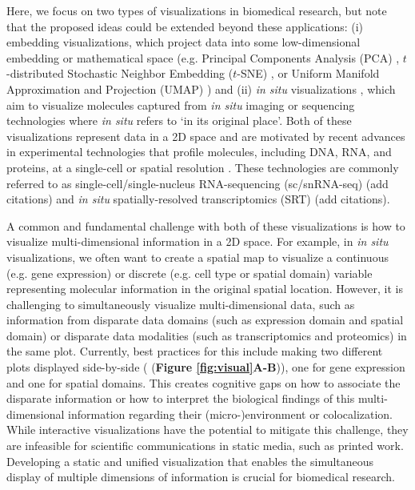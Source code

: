 \documentclass[10pt,twocolumn]{article}
\newcommand{\fixme}[1]{{\color{red} (#1)}}
\begin{document}
Here, we focus on two types of visualizations in biomedical research, but note that the proposed ideas could be extended beyond these applications: (i) embedding visualizations, which project data into some low-dimensional embedding or mathematical space (e.g. Principal Components Analysis (PCA) \cite{hotelling_1933}, $t$-distributed Stochastic Neighbor Embedding ($t$-SNE) \cite{vandermaaten_2008}, or Uniform Manifold Approximation and Projection (UMAP) \cite{becht_2019}) and (ii) \textit{in situ} visualizations \cite{dries_2021, Lewis_2021, odonoghue_2021}, which aim to visualize molecules captured from \textit{in situ} imaging or sequencing technologies where \textit{in situ} refers to `in its original place'. Both of these visualizations represent data in a 2D space and are motivated by recent advances in experimental technologies that profile molecules, including DNA, RNA, and proteins, at a single-cell or spatial resolution \cite{kashima_2020, moffitt_2022}. These technologies are commonly referred to as single-cell/single-nucleus RNA-sequencing (sc/snRNA-seq) \fixme{add citations} and \textit{in situ} spatially-resolved transcriptomics (SRT) \fixme{add citations}.  

A common and fundamental challenge with both of these visualizations is how to visualize multi-dimensional information in a 2D space. For example, in \textit{in situ} visualizations, we often want to create a spatial map to visualize a continuous (e.g. gene expression) or discrete (e.g. cell type or spatial domain) variable representing molecular information in the original spatial location. However, it is challenging to simultaneously visualize multi-dimensional data, such as information from disparate data domains (such as expression domain and spatial domain) or disparate data modalities (such as transcriptomics and proteomics) in the same plot. Currently, best practices for this include making two different plots displayed side-by-side (\fixme{\textbf{Figure \textbf{\ref{fig:visual}A-B}}}), one for gene expression and one for spatial domains. This creates cognitive gaps on how to associate the disparate information or how to interpret the biological findings of this multi-dimensional information regarding their (micro-)environment or colocalization. While interactive visualizations \cite{keller_2021, pardo_2022, sriworarat_2023} have the potential to mitigate this challenge, they are infeasible for scientific communications in static media, such as printed work. Developing a static and unified visualization that enables the simultaneous display of multiple dimensions of information is crucial for biomedical research.
\end{document}
